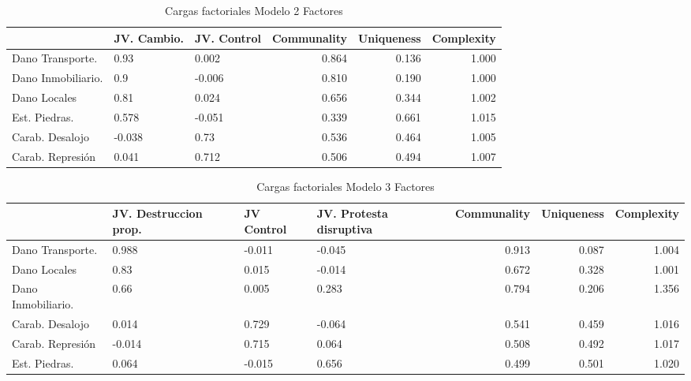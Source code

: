 \documentclass[12pt,twoside]{templates/facsothesis}
\begin{document}
\begin{table}

\caption{\label{tab:f2t}Cargas factoriales Modelo 2 Factores}
\centering
\begin{tabular}[t]{l|l|l|r|r|r}
\hline
  & JV. Cambio. & JV. Control & Communality & Uniqueness & Complexity\\
\hline
Dano Transporte. & 0.93 & 0.002 & 0.864 & 0.136 & 1.000\\
\hline
Dano Inmobiliario. & 0.9 & -0.006 & 0.810 & 0.190 & 1.000\\
\hline
Dano Locales & 0.81 & 0.024 & 0.656 & 0.344 & 1.002\\
\hline
Est. Piedras. & 0.578 & -0.051 & 0.339 & 0.661 & 1.015\\
\hline
Carab. Desalojo & -0.038 & 0.73 & 0.536 & 0.464 & 1.005\\
\hline
Carab. Represión & 0.041 & 0.712 & 0.506 & 0.494 & 1.007\\
\hline
\end{tabular}
\end{table}

\begin{table}

\caption{\label{tab:f3t}Cargas factoriales Modelo 3 Factores}
\centering
\begin{tabular}[t]{l|l|l|l|r|r|r}
\hline
  & JV. Destruccion prop. & JV Control & JV. Protesta disruptiva & Communality & Uniqueness & Complexity\\
\hline
Dano Transporte. & 0.988 & -0.011 & -0.045 & 0.913 & 0.087 & 1.004\\
\hline
Dano Locales & 0.83 & 0.015 & -0.014 & 0.672 & 0.328 & 1.001\\
\hline
Dano Inmobiliario. & 0.66 & 0.005 & 0.283 & 0.794 & 0.206 & 1.356\\
\hline
Carab. Desalojo & 0.014 & 0.729 & -0.064 & 0.541 & 0.459 & 1.016\\
\hline
Carab. Represión & -0.014 & 0.715 & 0.064 & 0.508 & 0.492 & 1.017\\
\hline
Est. Piedras. & 0.064 & -0.015 & 0.656 & 0.499 & 0.501 & 1.020\\
\hline
\end{tabular}
\end{table}
\end{document}
